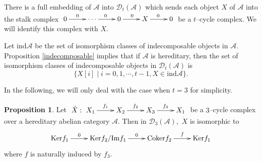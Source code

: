 \documentclass{amsart}
\theoremstyle{definition}
\newtheorem{Prop}[theorem]{Proposition}
\numberwithin{equation}{section}
\begin{document}
There is a full embedding of $\mathcal{A}$ into ${{\mathcal{D}}}_t
(\mathcal{A})$ which sends each object $X$ of $\mathcal{A}$ into the
stalk complex $ \xymatrix{
 0\ar[r]^-{0}&  \cdots \ar[r]^{0} &0\ar[r]^{0}    & X\ar[r]^{0}&0}$ be a
 $t$--cycle complex. We will identify this complex with $X$.

Let $\mathrm{ind}\mathcal{A}$ be the set of isomorphism classes of
indecomposable objects in $\mathcal{A}.$ Proposition
\ref{indecomposable} implies that if $\mathcal{A}$ is hereditary,
then the set of isomorphism classes of indecomposable objects in
${{\mathcal{D}}}_t(\mathcal{A})$ is
$$
\{X[i]\mid i=0,1,\cdots,t-1, X \in \mathrm{ind}\mathcal{A}\}.
$$

In the following, we will only deal with the case when $t=3$ for
simplicity.

\begin{Prop}\label{indecomposable2}Let
$ \xymatrix{\dot{X}:\,\,
X_1\ar[r]^-{f_1}&X_2\ar[r]^{f_2}&X_3\ar[r]^{f_3}&X_1}$ be a
 $3$--cycle complex over a hereditary abelian category $\mathcal{A}$. Then in ${{\mathcal{D}}}_3(\mathcal{A}),$ $\dot{X}$ is isomorphic to
 $$
\xymatrix{\mathrm{Ker}f_1\ar[r]^-{0}&\mathrm{Ker}f_2/\mathrm{Im}f_1\ar[r]^-{0}&\mathrm{Coker}f_2\ar[r]^-{f}&\mathrm{Ker}f_1}
 $$
where $f$ is naturally induced by $f_3.$
\end{Prop}
\end{document}
